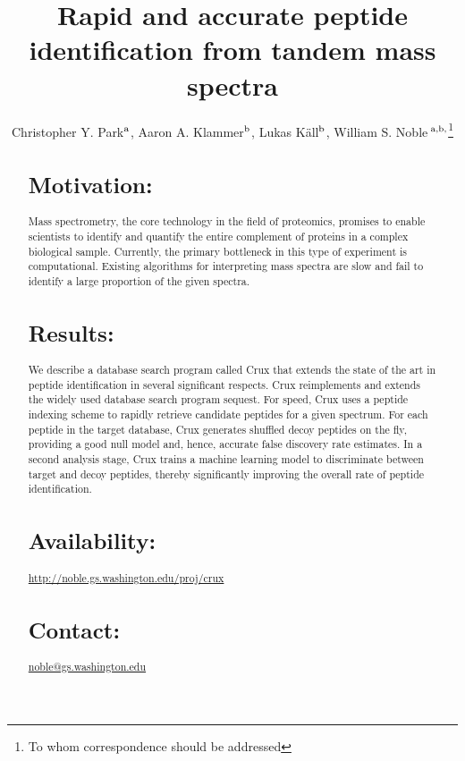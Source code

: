 \documentclass{bioinfo}
\begin{document}

\title[Rapid and accurate peptide identification]{Rapid and accurate
  peptide identification from tandem mass spectra}
\author[Park \textit{et~al}]{Christopher Y. Park$^{\rm a}$,
Aaron A. Klammer$^{\rm b}$,
Lukas K\"{a}ll$^{\rm b}$, 
William S. Noble\,$^{\rm a,b,}$\footnote{To whom correspondence should be addressed}}
\address{
$^{\rm a}$Department of Computer Science and Engineering,
$^{\rm b}$Department of Genome Sciences, University of Washington,
  Seattle, WA, USA
}


\maketitle

\begin{abstract}
\section{Motivation:}  Mass spectrometry, the core technology in the
field of proteomics, promises to enable scientists to identify and
quantify the entire complement of proteins in a complex biological
sample.  Currently, the primary bottleneck in this type of experiment
is computational.  Existing algorithms for interpreting mass spectra
are slow and fail to identify a large proportion of the given spectra.

\section{Results:} We describe a database search program called Crux
that extends the state of the art in peptide identification in several
significant respects.  Crux reimplements and extends the widely used
database search program {\sc sequest}.  For speed, Crux uses a peptide
indexing scheme to rapidly retrieve candidate peptides for a given
spectrum.  For each peptide in the target database, Crux generates
shuffled decoy peptides on the fly, providing a good null model and,
hence, accurate false discovery rate estimates.  In a second analysis
stage, Crux trains a machine learning model to discriminate between
target and decoy peptides, thereby significantly improving the overall
rate of peptide identification.

\section{Availability:}
\href{http://noble.gs.washington.edu/proj/crux}{http://noble.gs.washington.edu/proj/crux}
\section{Contact:} \href{noble@gs.washington.edu}{noble@gs.washington.edu}
\end{abstract}
\end{document}
